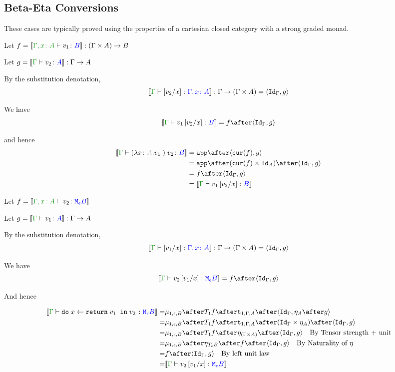\documentclass{report}
\begin{document}
\subsection{Beta-Eta Conversions}
These cases are typically proved using the properties of a cartesian closed category with a strong graded monad.

    Let $f = \deno{\typerelation{\gax}{v_1}{B}}: (\G \times A) \rightarrow B$

    Let $g = \deno{\gtyperelation{v_2}{A}}: \G \rightarrow A$

    By the substitution denotation, $$\deno{\typerelation{\G}{\ssub{x}{v_2}}{\gax}}: \G \rightarrow (\G \times A) = \pr{\idg}{g}$$

    We have $$\deno{\gtyperelation{v_1\ssub{x}{v_2}}{B}} = f \after \pr{\idg}{g}$$

    and hence
    \begin{equation}
        \begin{split}
            \deno{\gtyperelation{\apply{(\lam{x}{A}{v_1})}{v_2}}{B}} & = \app\after\pr{\cur{f}}{g} \\
            & = \app\after(\cur{f}\times\Id{A})\after\pr{\idg}{g}\\
            & = f \after \pr{\idg}{g} \\
            & = \deno{\gtyperelation{v_1\ssub{x}{v_2}}{B}}  
        \end{split}
    \end{equation}
   

Let $f = \deno{\typerelation{\gax}{v_2}{\meb}}$

Let $g = \deno{\gtyperelation{v_1}{A}}: \G \rightarrow A$

By the substitution denotation, $$\deno{\typerelation{\G}{\ssub{x}{v_1}}{\gax}}: \G \rightarrow (\G \times A) = \pr{\idg}{g}$$

We have $$\deno{\gtyperelation{v_2\ssub{x}{v_1}}{\meb}} = f \after \pr{\idg}{g}$$

And hence

\begin{equation}
    \begin{split}
        \deno{\gtyperelation{\doin{x}{\return{v_1}}{v_2}}{\meb}} = &  \bind{\1}{\e}{B} \after \T{\1}{f} \after \tstrength{1}{\G}{A} \after \pr{\idg}{\point{A}\after g} \\
        = & \bind{\1}{\e}{B} \after \T{\1}{f} \after \tstrength{1}{\G}{A} \after (\idg\times \point{A}) \after \pr{\idg}{g} \\
        = & \bind{\1}{\e}{B} \after \T{\1}{f} \after \point{(\G \times A)} \after \pr{\idg}{g} \qt{By Tensor strength + unit}\\
        = & \bind{\1}{\e}{B}\after\point{\teb}\after f\after\pr{\idg}{g} \qt{By Naturality of $\point{}$}\\
        = & f\after\pr{\idg}{g} \qt{By left unit law}\\
        = & \deno{\gtyperelation{v_2\ssub{x}{v_1}}{\meb}}\\
    \end{split}
\end{equation}
\end{document}
